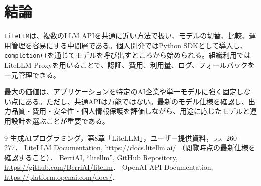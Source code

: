 \documentclass[11pt,a4paper]{bxjsarticle}
\newcommand{\litellm}{\texttt{LiteLLM}}
\begin{document}
\section{結論}
\litellm{}は、複数のLLM APIを共通に近い方法で扱い、モデルの切替、比較、運用管理を容易にする中間層である。個人開発ではPython SDKとして導入し、\texttt{completion()}を通じてモデルを呼び出すところから始められる。組織利用ではLiteLLM Proxyを用いることで、認証、費用、利用量、ログ、フォールバックを一元管理できる。

最大の価値は、アプリケーションを特定のAI企業や単一モデルに強く固定しない点にある。ただし、共通APIは万能ではない。最新のモデル仕様を確認し、出力品質・費用・安全性・個人情報保護を評価しながら、用途に応じたモデルと運用設計を選ぶことが重要である。

\begin{thebibliography}{9}
 生成AIプログラミング，第8章「LiteLLM」，ユーザー提供資料，pp.~260--277．
 LiteLLM Documentation, \url{https://docs.litellm.ai/} （閲覧時点の最新仕様を確認すること）．
 BerriAI, ``litellm'', GitHub Repository, \url{https://github.com/BerriAI/litellm}．
 OpenAI API Documentation, \url{https://platform.openai.com/docs/}．
\end{thebibliography}
\end{document}
